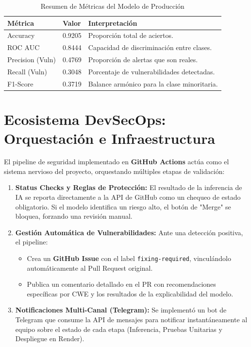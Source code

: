 \documentclass[11pt,a4paper]{article}
\begin{document}
\begin{table}[H]
\centering
\caption{Resumen de Métricas del Modelo de Producción}
\begin{tabular}{@{}lll@{}}
\toprule
\textbf{Métrica} & \textbf{Valor} & \textbf{Interpretación} \\
\midrule
Accuracy & 0.9205 & Proporción total de aciertos. \\
ROC AUC & 0.8444 & Capacidad de discriminación entre clases. \\
Precision (Vuln) & 0.4769 & Proporción de alertas que son reales. \\
Recall (Vuln) & 0.3048 & Porcentaje de vulnerabilidades detectadas. \\
F1-Score & 0.3719 & Balance armónico para la clase minoritaria. \\
\bottomrule
\end{tabular}
\end{table}

\section{Ecosistema DevSecOps: Orquestación e Infraestructura}

El pipeline de seguridad implementado en \textbf{GitHub Actions} actúa como el sistema nervioso del proyecto, orquestando múltiples etapas de validación:

\begin{enumerate}
    \item \textbf{Status Checks y Reglas de Protección:} El resultado de la inferencia de IA se reporta directamente a la API de GitHub como un chequeo de estado obligatorio. Si el modelo identifica un riesgo alto, el botón de "Merge" se bloquea, forzando una revisión manual.
    \item \textbf{Gestión Automática de Vulnerabilidades:} Ante una detección positiva, el pipeline:
    \begin{itemize}
        \item Crea un \textbf{GitHub Issue} con el label \texttt{fixing-required}, vinculándolo automáticamente al Pull Request original.
        \item Publica un comentario detallado en el PR con recomendaciones específicas por CWE y los resultados de la explicabilidad del modelo.
    \end{itemize}
    \item \textbf{Notificaciones Multi-Canal (Telegram):} Se implementó un bot de Telegram que consume la API de mensajes para notificar instantáneamente al equipo sobre el estado de cada etapa (Inferencia, Pruebas Unitarias y Despliegue en Render).
\end{enumerate}
\end{document}
